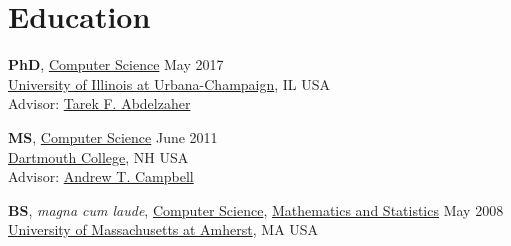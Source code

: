 
\section{\sc Education}
\textbf{PhD}, {\href{http://www.cs.illinois.edu/}{Computer Science}} \hfill May 2017 \\
{\href{http://www.illinois.edu/}{University of Illinois at Urbana-Champaign}}, IL USA \\
Advisor: {\href{http://web.engr.illinois.edu/~zaher/}{Tarek F. Abdelzaher}}
\vspace{-0.16cm}

\textbf{MS}, {\href{http://www.cs.dartmouth.edu/}{Computer Science}} \hfill June 2011 \\
{\href{http://www.dartmouth.edu/}{Dartmouth College}}, NH USA \\
Advisor: {\href{http://www.cs.dartmouth.edu/~campbell}{Andrew T. Campbell}}
\vspace{-0.16cm}

\textbf{BS}, \emph{magna cum laude}, {\href{http://www.cs.umass.edu/}{Computer Science}}, {\href{http://www.math.umass.edu/}{Mathematics and Statistics}}
 \hfill May 2008 \\
{\href{http://www.umass.edu/}{University of Massachusetts at Amherst}}, MA USA



%
%
